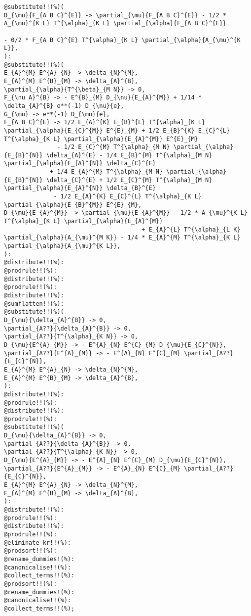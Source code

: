 \documentclass[11pt]{article}
\begin{document}
{\color[named]{Blue}\begin{verbatim}
@substitute!!(%)(
D_{\mu}{F_{A B C}^{E}} -> \partial_{\mu}{F_{A B C}^{E}} - 1/2 * A_{\mu}^{K L} T^{\alpha}_{K L} \partial_{\alpha}{F_{A B C}^{E}}
                                                                                                    - 0/2 * F_{A B C}^{E} T^{\alpha}_{K L} \partial_{\alpha}{A_{\mu}^{K L}},
):
@substitute!!(%)(
E_{A}^{M} E^{A}_{N} -> \delta_{N}^{M},
E_{A}^{M} E^{B}_{M} -> \delta_{A}^{B},
\partial_{\alpha}{T^{\beta}_{M N}} -> 0,
F_{\nu A}^{B} -> - E^{B}_{M} D_{\nu}{E_{A}^{M}} + 1/14 * \delta_{A}^{B} e**(-1) D_{\nu}{e},
G_{\mu} -> e**(-1) D_{\mu}{e},
F_{A B C}^{E} -> 1/2 E_{A}^{K} E_{B}^{L} T^{\alpha}_{K L} \partial_{\alpha}{E_{C}^{M}} E^{E}_{M} + 1/2 E_{B}^{K} E_{C}^{L} T^{\alpha}_{K L} \partial_{\alpha}{E_{A}^{M}} E^{E}_{M}
               - 1/2 E_{C}^{M} T^{\alpha}_{M N} \partial_{\alpha}{E_{B}^{N}} \delta_{A}^{E} - 1/4 E_{B}^{M} T^{\alpha}_{M N} \partial_{\alpha}{E_{A}^{N}} \delta_{C}^{E}
             + 1/4 E_{A}^{M} T^{\alpha}_{M N} \partial_{\alpha}{E_{B}^{N}} \delta_{C}^{E} + 1/2 E_{C}^{M} T^{\alpha}_{M N} \partial_{\alpha}{E_{A}^{N}} \delta_{B}^{E}
              - 1/2 E_{A}^{K} E_{C}^{L} T^{\alpha}_{K L} \partial_{\alpha}{E_{B}^{M}} E^{E}_{M},
D_{\mu}{E_{A}^{M}} -> \partial_{\mu}{E_{A}^{M}} - 1/2 * A_{\mu}^{K L} T^{\alpha}_{K L} \partial_{\alpha}{E_{A}^{M}}
                                       + E_{A}^{L} T^{\alpha}_{L K} \partial_{\alpha}{A_{\mu}^{M K}} - 1/4 * E_{A}^{M} T^{\alpha}_{K L} \partial_{\alpha}{A_{\mu}^{K L}},
):
@distribute!!(%):
@prodrule!!(%):
@distribute!!(%):
@prodrule!!(%):
@distribute!!(%):
@sumflatten!!(%):
@substitute!!(%)(
D_{\mu}{\delta_{A}^{B}} -> 0,
\partial_{A??}{\delta_{A}^{B}} -> 0,
\partial_{A??}{T^{\alpha}_{K N}} -> 0,
D_{\mu}{E^{A}_{M}} -> - E^{A}_{N} E^{C}_{M} D_{\mu}{E_{C}^{N}},
\partial_{A??}{E^{A}_{M}} -> - E^{A}_{N} E^{C}_{M} \partial_{A??}{E_{C}^{N}},
E_{A}^{M} E^{A}_{N} -> \delta_{N}^{M},
E_{A}^{M} E^{B}_{M} -> \delta_{A}^{B},
):
@distribute!!(%):
@prodrule!!(%):
@distribute!!(%):
@prodrule!!(%):
@substitute!!(%)(
D_{\mu}{\delta_{A}^{B}} -> 0,
\partial_{A??}{\delta_{A}^{B}} -> 0,
\partial_{A??}{T^{\alpha}_{K N}} -> 0,
D_{\mu}{E^{A}_{M}} -> - E^{A}_{N} E^{C}_{M} D_{\mu}{E_{C}^{N}},
\partial_{A??}{E^{A}_{M}} -> - E^{A}_{N} E^{C}_{M} \partial_{A??}{E_{C}^{N}},
E_{A}^{M} E^{A}_{N} -> \delta_{N}^{M},
E_{A}^{M} E^{B}_{M} -> \delta_{A}^{B},
):
@distribute!!(%):
@prodrule!!(%):
@distribute!!(%):
@prodrule!!(%):
@eliminate_kr!!(%):
@prodsort!!(%):
@rename_dummies!(%):
@canonicalise!!(%):
@collect_terms!!(%):
@prodsort!!(%):
@rename_dummies!(%):
@canonicalise!!(%):
@collect_terms!!(%);
\end{verbatim}}
\end{document}
